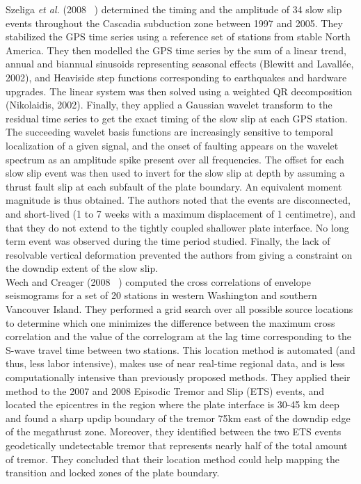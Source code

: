 \documentclass[main.tex]{subfiles}
\begin{document}
Szeliga \textit{et al.} (2008 ~\cite{SZE_2008}) determined the timing and the amplitude of 34 slow slip events throughout the Cascadia subduction zone between 1997 and 2005. They stabilized the GPS time series using a reference set of stations from stable North America. They then modelled the GPS time series by the sum of a linear trend, annual and biannual sinusoids representing seasonal effects (Blewitt and Lavall\'ee, 2002), and Heaviside step functions corresponding to earthquakes and hardware upgrades. The linear system was then solved using a weighted QR decomposition (Nikolaidis, 2002). Finally, they applied a Gaussian wavelet transform to the residual time series to get the exact timing of the slow slip at each GPS station. The succeeding wavelet basis functions are increasingly sensitive to temporal localization of a given signal, and the onset of faulting appears on the wavelet spectrum as an amplitude spike present over all frequencies. The offset for each slow slip event was then used to invert for the slow slip at depth by assuming a thrust fault slip at each subfault of the plate boundary. An equivalent moment magnitude is thus obtained. The authors noted that the events are disconnected, and short-lived (1 to 7 weeks with a maximum displacement of 1 centimetre), and that they do not extend to the tightly coupled shallower plate interface. No long term event was observed during the time period studied. Finally, the lack of resolvable vertical deformation prevented the authors from giving a constraint on the downdip extent of the slow slip. \\

Wech and Creager (2008 ~\cite{WEC_2008}) computed the cross correlations of envelope seismograms for a set of 20 stations in western Washington and southern Vancouver Island. They performed a grid search over all possible source locations to determine which one minimizes the difference between the maximum cross correlation and the value of the correlogram at the lag time corresponding to the S-wave travel time between two stations. This location method is automated (and thus, less labor intensive), makes use of near real-time regional data, and is less computationally intensive than previously proposed methods. They applied their method to the 2007 and 2008 Episodic Tremor and Slip (ETS) events, and located the epicentres in the region where the plate interface is 30-45 km deep and found a sharp updip boundary of the tremor 75km east of the downdip edge of the megathrust zone. Moreover, they identified between the two ETS events geodetically undetectable tremor that represents nearly half of the total amount of tremor. They concluded that their location method could help mapping the transition and locked zones of the plate boundary. \\
\end{document}
